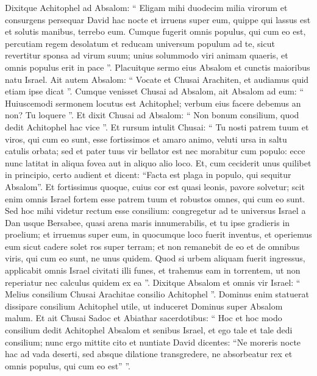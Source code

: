 \begin{biblechapter}
\begin{biblechapter}
\begin{biblechapter}
\begin{biblechapter}
\begin{biblechapter}
\begin{biblechapter}
\begin{biblechapter}
\begin{biblechapter}
\begin{biblechapter}
\begin{biblechapter}
\begin{biblechapter}
\begin{biblechapter}
\begin{biblechapter}
\begin{biblechapter}
\begin{biblechapter}
\begin{biblechapter}
\begin{biblechapter}
\verse Dixitque Achitophel ad Absalom: “ Eligam mihi duodecim milia virorum et consurgens persequar David hac nocte 
\verse et irruens super eum, quippe qui lassus est et solutis manibus, terrebo eum. Cumque fugerit omnis populus, qui cum eo est, percutiam regem desolatum 
\verse et reducam universum populum ad te, sicut revertitur sponsa ad virum suum; unius solummodo viri animam quaeris, et omnis populus erit in pace ”. 
\verse Placuitque sermo eius Absalom et cunctis maioribus natu Israel.
 \verse Ait autem Absalom: “ Vocate et Chusai Arachiten, et audiamus quid etiam ipse dicat ”. 
\verse Cumque venisset Chusai ad Absalom, ait Absalom ad eum: “ Huiuscemodi sermonem locutus est Achitophel; verbum eius facere debemus an non? Tu loquere ”. 
\verse Et dixit Chusai ad Absalom: “ Non bonum consilium, quod dedit Achitophel hac vice ”. 
\verse Et rursum intulit Chusai: “ Tu nosti patrem tuum et viros, qui cum eo sunt, esse fortissimos et amaro animo, veluti ursa in saltu catulis orbata; sed et pater tuus vir bellator est nec morabitur cum populo: 
\verse ecce nunc latitat in aliqua fovea aut in aliquo alio loco. Et, cum ceciderit unus quilibet in principio, certo audient et dicent: “Facta est plaga in populo, qui sequitur Absalom”. 
\verse Et fortissimus quoque, cuius cor est quasi leonis, pavore solvetur; scit enim omnis Israel fortem esse patrem tuum et robustos omnes, qui cum eo sunt. 
\verse Sed hoc mihi videtur rectum esse consilium: congregetur ad te universus Israel a Dan usque Bersabee, quasi arena maris innumerabilis, et tu ipse gradieris in proelium; 
\verse et irruemus super eum, in quocumque loco fuerit inventus, et operiemus eum sicut cadere solet ros super terram; et non remanebit de eo et de omnibus viris, qui cum eo sunt, ne unus quidem. 
\verse Quod si urbem aliquam fuerit ingressus, applicabit omnis Israel civitati illi funes, et trahemus eam in torrentem, ut non reperiatur nec calculus quidem ex ea ”. 
\verse Dixitque Absalom et omnis vir Israel: “ Melius consilium Chusai Arachitae consilio Achitophel ”. Dominus enim statuerat dissipare consilium Achitophel utile, ut induceret Dominus super Absalom malum.
 \verse Et ait Chusai Sadoc et Abiathar sacerdotibus: “ Hoc et hoc modo consilium dedit Achitophel Absalom et senibus Israel, et ego tale et tale dedi consilium; 
\verse nunc ergo mittite cito et nuntiate David dicentes: “Ne moreris nocte hac ad vada deserti, sed absque dilatione transgredere, ne absorbeatur rex et omnis populus, qui cum eo est” ”.

\end{biblechapter}
\end{biblechapter}
\end{biblechapter}
\end{biblechapter}
\end{biblechapter}
\end{biblechapter}
\end{biblechapter}
\end{biblechapter}
\end{biblechapter}
\end{biblechapter}
\end{biblechapter}
\end{biblechapter}
\end{biblechapter}
\end{biblechapter}
\end{biblechapter}
\end{biblechapter}
\end{biblechapter}
